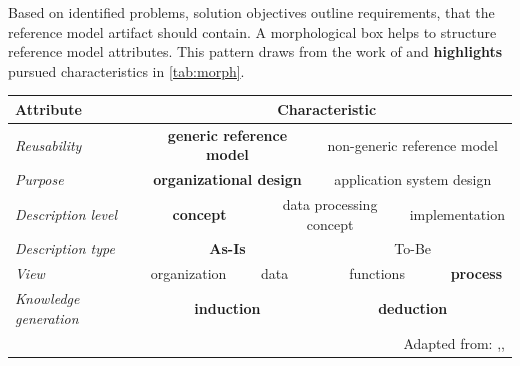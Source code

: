 Based on identified problems, solution objectives outline requirements, that the reference model artifact should contain. A morphological box helps to structure reference model attributes. This pattern draws from the work of \cite{Puster2015} and \textbf{highlights} pursued characteristics in \Tab \ref{tab:morph}.  

\begin{table}[caption={Reference model requirements }, label=tab:morph]
	\centering
		\begin{tabular}{ 
				p{3.1cm}  
			p{2cm} p{2cm} p{2cm} p{2cm} p{2cm} p{2cm} p{2cm} p{2cm} p{2cm} p{2cm} p{2cm} p{2cm}    }
			Attribute                                   & \multicolumn{12}{c}{ Characteristic }                                                                                                                  \\ \hline
			\multicolumn{1}{|l|}{\textit{Reusability}}          & \multicolumn{6}{c|}{\textbf{generic reference model}}                       & \multicolumn{6}{c|}{non-generic reference model}                  \\ \hline
			\multicolumn{1}{|l|}{\textit{Purpose}}              & \multicolumn{6}{c|}{\textbf{organizational design}}                         & \multicolumn{6}{c|}{application system design}                    \\ \hline
			\multicolumn{1}{|l|}{\textit{Description level}}    & \multicolumn{4}{c|}{\textbf{concept}}                & \multicolumn{4}{c|}{data processing concept} & \multicolumn{4}{c|}{implementation}       \\ \hline
			\multicolumn{1}{|l|}{\textit{Description type}}     & \multicolumn{6}{c|}{\textbf{As-Is}}                  & \multicolumn{6}{c|}{To-Be}                             \\ \hline
			\multicolumn{1}{|l|}{\textit{View}}                 & \multicolumn{3}{c|}{organization} & \multicolumn{3}{c|}{data}    & \multicolumn{3}{c|}{functions}   & \multicolumn{3}{c|}{\textbf{process}} \\ \hline
			\multicolumn{1}{|l|}{\textit{Knowledge generation}} & \multicolumn{6}{c|}{\textbf{induction}}                                     & \multicolumn{6}{c|}{\textbf{deduction}}                                    \\ \hline 
			\multicolumn{13}{r}{Adapted from: \citep[\p{63}]{Puster2015},\citep[\p{98}]{brocke2003referenzmodellierung}, \citep[\p{248}]{thomas2006mang}  }       
			
	\end{tabular}
\end{table}

